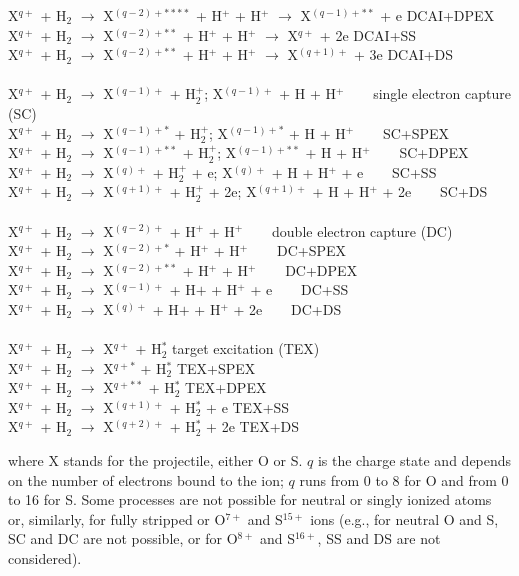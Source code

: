 \documentclass[draft]{agujournal2018}
\begin{document}
\begin{tabbing}
\> X$^{q+}$ + H$_2$ $\rightarrow$ X$^{(q-2)+****}$ + H$^+$ + H$^+$ $\rightarrow$ X$^{(q-1)+**}$ + e  \>  \> DCAI+DPEX \\
\> X$^{q+}$ + H$_2$ $\rightarrow$ X$^{(q-2)+**}$ + H$^+$ + H$^+$ $\rightarrow$ X$^{q+}$ + 2e  \>  \> DCAI+SS \\
\> X$^{q+}$ + H$_2$ $\rightarrow$ X$^{(q-2)+**}$ + H$^+$ + H$^+$ $\rightarrow$ X$^{(q+1)+}$ + 3e  \>  \> DCAI+DS \\
\\
\> X$^{q+}$ + H$_2$ $\rightarrow$ X$^{(q-1)+}$ + H$_2^+$;  X$^{(q-1)+}$ + H + H$^+$ \> $\;\;\;\;\;$ \> single electron capture (SC) \\
\> X$^{q+}$ + H$_2$ $\rightarrow$ X$^{(q-1)+*}$ + H$_2^+$;  X$^{(q-1)+*}$ + H + H$^+$ \> $\;\;\;\;\;$ \> SC+SPEX \\
\> X$^{q+}$ + H$_2$ $\rightarrow$ X$^{(q-1)+**}$ + H$_2^+$;  X$^{(q-1)+**}$ + H + H$^+$ \> $\;\;\;\;\;$ \> SC+DPEX \\
\> X$^{q+}$ + H$_2$ $\rightarrow$ X$^{(q)+}$ + H$_2^+$ + e;  X$^{(q)+}$ + H + H$^+$ + e \> $\;\;\;\;\;$ \> SC+SS \\
\> X$^{q+}$ + H$_2$ $\rightarrow$ X$^{(q+1)+}$ + H$_2^+$ + 2e;  X$^{(q+1)+}$ + H + H$^+$ + 2e \> $\;\;\;\;\;$ \> SC+DS \\
\\
\> X$^{q+}$ + H$_2$ $\rightarrow$ X$^{(q-2)+}$ + H$^+$ + H$^+$ \> $\;\;\;\;\;$ \> double electron capture (DC) \\
\> X$^{q+}$ + H$_2$ $\rightarrow$ X$^{(q-2)+*}$ + H$^+$ + H$^+$ \> $\;\;\;\;\;$ \> DC+SPEX \\
\> X$^{q+}$ + H$_2$ $\rightarrow$ X$^{(q-2)+**}$ + H$^+$ + H$^+$ \> $\;\;\;\;\;$ \> DC+DPEX \\
\> X$^{q+}$ + H$_2$ $\rightarrow$ X$^{(q-1)+}$ + H$+$ + H$^+$ + e \> $\;\;\;\;\;$ \> DC+SS \\
\> X$^{q+}$ + H$_2$ $\rightarrow$ X$^{(q)+}$ + H$+$ + H$^+$ + 2e \> $\;\;\;\;\;$ \> DC+DS \\
\\
\> X$^{q+}$ + H$_2$ $\rightarrow$ X$^{q+}$ + H$_2^*$  \> \> target excitation (TEX) \\
\> X$^{q+}$ + H$_2$ $\rightarrow$ X$^{q+*}$ + H$_2^*$  \> \> TEX+SPEX \\
\> X$^{q+}$ + H$_2$ $\rightarrow$ X$^{q+**}$ + H$_2^*$  \> \> TEX+DPEX \\
\> X$^{q+}$ + H$_2$ $\rightarrow$ X$^{(q+1)+}$ + H$_2^*$ + e  \> \> TEX+SS \\
\> X$^{q+}$ + H$_2$ $\rightarrow$ X$^{(q+2)+}$ + H$_2^*$ + 2e \> \> TEX+DS
\end{tabbing}
where X stands for the projectile, either O or S. $q$ is the charge state and depends on the number of electrons bound to the ion; $q$ runs from 0 to 8 for O and from 0 to 16 for S.
Some processes are not possible for neutral or singly ionized atoms or, similarly, for fully stripped or O$^{7+}$ and S$^{15+}$ ions (e.g., for neutral O and S, SC and DC are not possible, or for O$^{8+}$ and S$^{16+}$, SS and DS are not considered).
\end{document}
